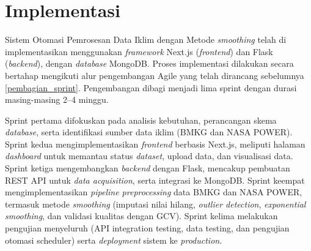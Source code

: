 \section{Implementasi}
Sistem Otomasi Pemrosesan Data Iklim dengan Metode \textit{smoothing} telah di implementasikan menggunakan \textit{framework} Next.js (\textit{frontend}) dan Flask (\textit{backend}), dengan \textit{database} MongoDB. Proses implementasi dilakukan secara bertahap mengikuti alur pengembangan Agile yang telah dirancang sebelumnya \ref{pembagian_sprint}. Pengembangan dibagi menjadi lima sprint dengan durasi masing-masing 2–4 minggu.

Sprint pertama difokuskan pada analisis kebutuhan, perancangan skema \textit{database}, serta identifikasi sumber data iklim (BMKG dan NASA POWER). Sprint kedua mengimplementasikan \textit{frontend} berbasis Next.js, meliputi halaman \textit{dashboard} untuk memantau status \textit{dataset}, upload data, dan visualisasi data. Sprint ketiga mengembangkan \textit{backend} dengan Flask, mencakup pembuatan REST API untuk \textit{data acquisition}, serta integrasi ke MongoDB. Sprint keempat mengimplementasikan \textit{pipeline preprocessing} data BMKG dan NASA POWER, termasuk metode \textit{smoothing} (imputasi nilai hilang, \textit{outlier detection}, \textit{exponential smoothing}, dan validasi kualitas dengan GCV). Sprint kelima melakukan pengujian menyeluruh (API integration testing, data testing, dan pengujian otomasi scheduler) serta \textit{deployment} sistem ke \textit{production}.

